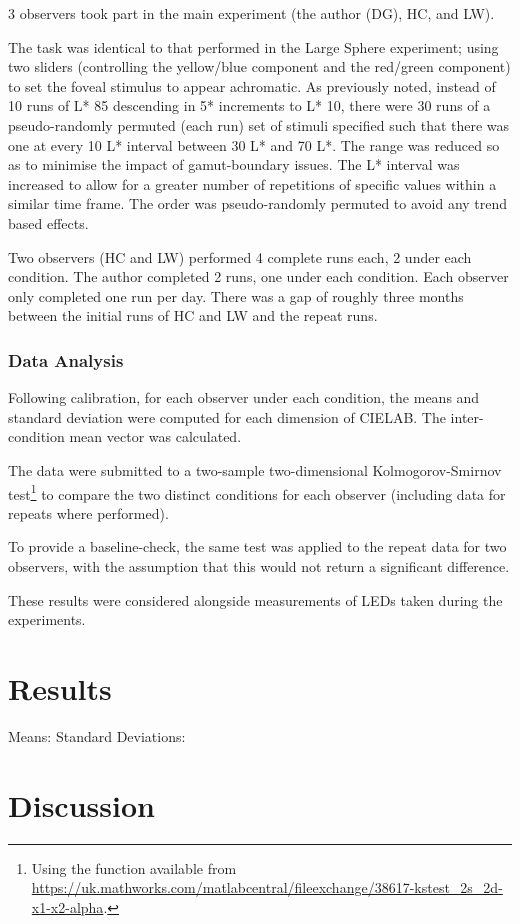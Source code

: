 3 observers took part in the main experiment (the author (DG), HC, and LW). 

The task was identical to that performed in the Large Sphere experiment; using two sliders (controlling the yellow/blue component and the red/green component) to set the foveal stimulus to appear achromatic. As previously noted, instead of 10 runs of L* 85 descending in 5* increments to L* 10, there were 30 runs of a pseudo-randomly permuted (each run) set of stimuli specified such that there was one at every 10 L* interval between 30 L* and 70 L*. The range was reduced so as to minimise the impact of gamut-boundary issues. The L* interval was increased to allow for a greater number of repetitions of specific values within a similar time frame. The order was pseudo-randomly permuted to avoid any trend based effects.

Two observers (HC and LW) performed 4 complete runs each, 2 under each condition. The author completed 2 runs, one under each condition. Each observer only completed one run per day. There was a gap of roughly three months between the initial runs of HC and LW and the repeat runs.

\subsubsection{Data Analysis}

Following calibration, for each observer under each condition, the means and standard deviation were computed for each dimension of CIELAB. The inter-condition mean vector was calculated.

The data were submitted to a two-sample two-dimensional Kolmogorov-Smirnov test\footnote{Using the function available from \url{https://uk.mathworks.com/matlabcentral/fileexchange/38617-kstest_2s_2d-x1-x2-alpha}.} to compare the two distinct conditions for each observer (including data for repeats where performed). 

To provide a baseline-check, the same test was applied to the repeat data for two observers, with the assumption that this would not return a significant difference.

These results were considered alongside measurements of LEDs taken during the experiments.

\section{Results}

Means:
Standard Deviations:




\section{Discussion}

